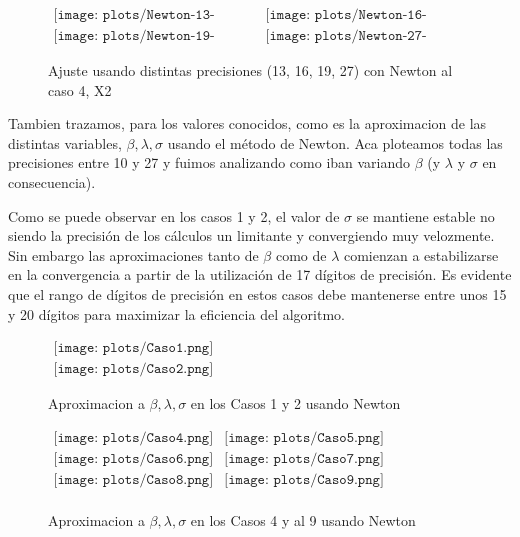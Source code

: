 \begin{figure} [H]
$\begin{array}{cc}
\texttt{[image: plots/Newton-13-caso4.png]} &
\texttt{[image: plots/Newton-16-caso4.png]} \\
\texttt{[image: plots/Newton-19-caso4.png]} &
\texttt{[image: plots/Newton-27-caso4.png]}
\end{array}$
\caption{Ajuste usando distintas precisiones (13, 16, 19, 27) con Newton al caso 4, X2}
\label{fig:FitCaso4Newton}
\end{figure}


Tambien trazamos, para los valores conocidos, como es la aproximacion de las distintas variables, $\beta, \lambda, \sigma$ usando el m\'etodo de Newton.
Aca ploteamos todas las precisiones entre 10 y 27 y fuimos analizando como iban variando $\beta$ (y $\lambda$ y $\sigma$ en consecuencia).

Como se puede observar en los casos 1 y 2, el valor de $\sigma$ se mantiene estable no siendo la precisi\'on de los c\'alculos un limitante y convergiendo muy velozmente. Sin embargo las aproximaciones tanto de $\beta$ como de $\lambda$ comienzan a estabilizarse en la convergencia a partir de la utilizaci\'on de 17 d\'igitos de precisi\'on. Es evidente que el rango de d\'igitos de precisi\'on en estos casos debe mantenerse entre unos 15 y 20 d\'igitos para maximizar la eficiencia del algoritmo.  

\begin{figure}
$\begin{array}{c}
\texttt{[image: plots/Caso1.png]} \\
\texttt{[image: plots/Caso2.png]}
\end{array}$

\caption{Aproximacion a $\beta, \lambda, \sigma$ en los Casos 1 y 2 usando Newton}
\end{figure}

\begin{figure}
$\begin{array}{cc}
\texttt{[image: plots/Caso4.png]} &
\texttt{[image: plots/Caso5.png]} \\
\texttt{[image: plots/Caso6.png]} &
\texttt{[image: plots/Caso7.png]} \\
\texttt{[image: plots/Caso8.png]} &
\texttt{[image: plots/Caso9.png]} \\

\end{array}$

\caption{Aproximacion a $\beta, \lambda, \sigma$ en los Casos 4 y al 9 usando Newton}
\label{fig:AproxCaso1}
\end{figure}


